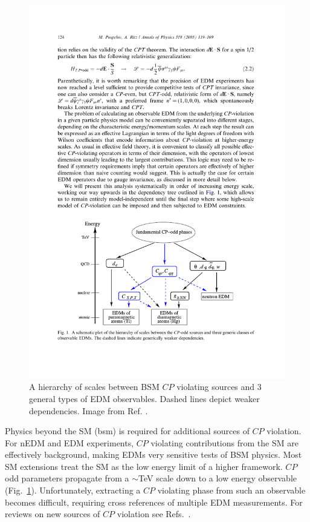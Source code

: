 \begin{figure}[htp]
    \centering
    \includegraphics[width=0.75 \textwidth]{figures/Pospelov_BSM_CPV.pdf}
    \caption[A hierarchy of scales between BSM $CP$ violating sources and 3 general types of EDM observables.]
    {A hierarchy of scales between BSM $CP$ violating sources and 3 general types of EDM observables. Dashed lines depict weaker dependencies. Image from Ref. \cite{POS05}.}
    \label{fig:bsm_cp_violation}
\end{figure}

Physics beyond the SM (\acrshort{bsm}) is required for additional sources of $CP$ violation. For nEDM and EDM experiments, $CP$ violating contributions from the SM are effectively background, making EDMs very sensitive tests of BSM physics. Most SM extensions treat the SM as the low energy limit of a higher framework. $CP$\textendash odd parameters propagate from a $\sim$\unit{\tera\eV} scale down to a low energy observable (Fig.~\ref{fig:bsm_cp_violation}). Unfortunately, extracting a $CP$ violating phase from such an observable becomes difficult, requiring cross references of multiple EDM measurements. For reviews on new sources of $CP$ violation see Refs.~\cite{Cir10, POS05, ENG13, CHU19}.

